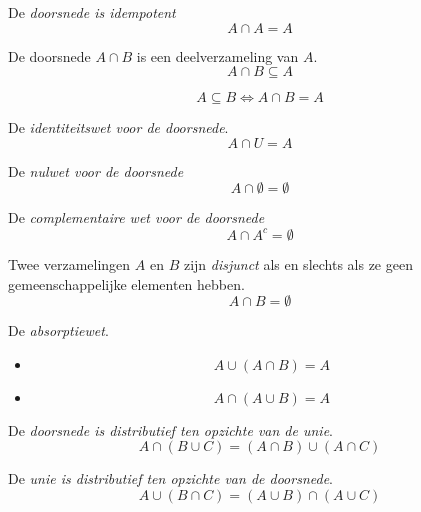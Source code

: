 \documentclass[main.tex]{subfiles}
\begin{document}
\begin{ei}
  De \emph{doorsnede is idempotent}
  \[ A \cap A = A \]
\end{ei} 

\begin{st}
  De doorsnede $A \cap B$ is een deelverzameling van $A$.
  \[ A \cap B \subseteq A \]
\end{st}

\begin{st}
  \[ A \subseteq B \Leftrightarrow A \cap B = A \]
\end{st}


\begin{st}
  De \emph{identiteitswet voor de doorsnede}.
  \[ A \cap U = A \]
\end{st}

\begin{st}
  De \emph{nulwet voor de doorsnede}
  \[ A \cap \emptyset = \emptyset \]
\end{st}

\begin{st}
  De \emph{complementaire wet voor de doorsnede}
  \[ A \cap A^{c} = \emptyset \]
\end{st}

\begin{de}
  Twee verzamelingen $A$ en $B$ zijn \emph{disjunct} als en slechts als ze geen gemeenschappelijke elementen hebben.
  \[ A \cap B = \emptyset \]
\end{de}

\begin{st}
  De \emph{absorptiewet}.
  \begin{itemize}
  \item \[ A \cup ( A \cap B ) = A\]
  \item \[ A \cap ( A \cup B ) = A\]
  \end{itemize}
\end{st}

\begin{st}
  De \emph{doorsnede is distributief ten opzichte van de unie}.
  \[ A \cap ( B \cup C ) = (A \cap B) \cup (A \cap C) \]

\end{st}

\begin{st}
  De \emph{unie is distributief ten opzichte van de doorsnede}.
  \[ A \cup ( B \cap C ) = (A \cup B) \cap (A \cup C) \]

\end{st}
\end{document}
